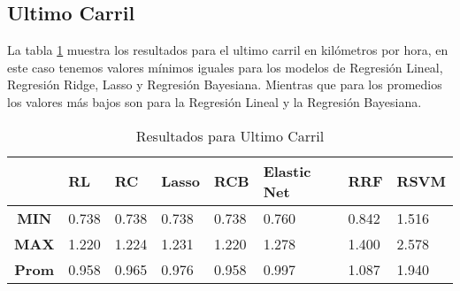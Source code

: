 \subsection{Ultimo Carril}

La tabla \ref{tab:resultadosScikitUltimoCarril} muestra los resultados para el ultimo carril en kilómetros por hora, en este caso tenemos valores mínimos iguales para los modelos de Regresión Lineal, Regresión Ridge, Lasso y Regresión Bayesiana. Mientras que para los promedios los valores más bajos son para la Regresión Lineal y la Regresión Bayesiana.

\begin{table}[H]
    \centering
    \caption{Resultados para Ultimo Carril}
    \label{tab:resultadosScikitUltimoCarril}
    \begin{tabular}{|c|l|l|l|l|l|l|l|} \hline
        & \textbf{RL} & \textbf{RC} & \textbf{Lasso} & \textbf{RCB} & \textbf{Elastic Net} & \textbf{RRF} & \textbf{RSVM} \\ \hline
        \textbf{MIN} & 0.738 & 0.738 & 0.738 & 0.738 & 0.760 & 0.842 & 1.516 \\ \hline
        \textbf{MAX} & 1.220 & 1.224 & 1.231 & 1.220 & 1.278 & 1.400 & 2.578 \\ \hline
        \textbf{Prom} & 0.958 & 0.965 & 0.976 & 0.958 & 0.997 & 1.087 & 1.940 \\ \hline
    \end{tabular}
\end{table}

